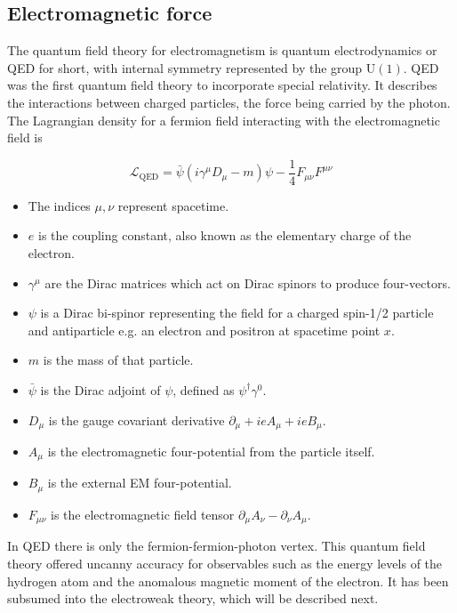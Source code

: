 \subsection{Electromagnetic force}
\label{qed}
The quantum field theory for electromagnetism is quantum electrodynamics or QED for short,
with internal symmetry represented by the group $\mathrm{U}(1)$. 
QED was the first quantum field theory to incorporate special relativity. 
It describes the interactions between charged particles, the force being carried by the photon.
The Lagrangian density for a fermion field interacting with the electromagnetic field is

\begin{equation}
\mathcal{L}_\mathrm{QED} = \bar{\psi}\left( i\gamma^\mu D_\mu - m \right) \psi - \frac{1}{4} F_{\mu\nu} F^{\mu\nu}
\end{equation}

\begin{itemize}
  \setlength\itemsep{0em}
  \item The indices $\mu,\nu$ represent spacetime.
  \item $e$ is the coupling constant, also known as the elementary charge of the electron.
  \item $\gamma^\mu$ are the Dirac matrices which act on Dirac spinors to produce four-vectors.
  \item $\psi$ is a Dirac bi-spinor representing the field for a charged spin-1/2 particle and antiparticle e.g. an electron and positron at spacetime point $x$.
  \item $m$ is the mass of that particle.
  \item $\bar{\psi}$ is the Dirac adjoint of $\psi$, defined as $\psi^\dagger \gamma^0$.
  \item $D_\mu$ is the gauge covariant derivative $\partial_\mu + ieA_\mu + ieB_\mu$.
  \item $A_\mu$ is the electromagnetic four-potential from the particle itself.
  \item $B_\mu$ is the external EM four-potential.
  \item $F_{\mu\nu}$ is the electromagnetic field tensor $\partial_\mu A_\nu - \partial_\nu A_\mu$.
\end{itemize}

In QED there is only the fermion-fermion-photon vertex. 
This quantum field theory offered uncanny accuracy for observables such as
the energy levels of the hydrogen atom and the anomalous magnetic moment of the electron.
It has been subsumed into the electroweak theory, which will be described next.

